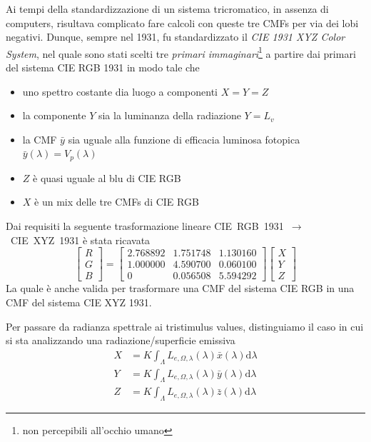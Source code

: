 Ai tempi della standardizzazione di un sistema tricromatico, in assenza di computers, risultava complicato fare calcoli con queste tre CMFs per via dei
lobi negativi. Dunque, sempre nel 1931, fu standardizzato il \textit{CIE 1931 XYZ Color System}, nel quale sono stati scelti tre 
\textit{primari immaginari}\footnote{non percepibili all'occhio umano} a partire dai primari del sistema CIE RGB 1931 in modo tale che
\begin{itemize}[topsep=0pt, noitemsep]
	\item uno spettro costante dia luogo a componenti $X = Y = Z$
	\item la componente $Y$ sia la luminanza della radiazione $Y = L_v$
	\item la CMF $\bar{y}$ sia uguale alla funzione di efficacia luminosa fotopica $\bar{y}(\lambda) = V_p(\lambda)$
	\item $Z$ \`e quasi uguale al blu di CIE RGB
	\item $X$ \`e un mix delle tre CMFs di CIE RGB
\end{itemize}
Dai requisiti la seguente trasformazione lineare \mbox{CIE RGB 1931 $\rightarrow$ CIE XYZ 1931} \`e stata ricavata
\begin{equation}\label{chapter2:colorimetry:RGB2XYZ}
	\begin{bmatrix}
		R \\ G \\ B
	\end{bmatrix}
	=
	\begin{bmatrix}
		2.768892 & 1.751748 & 1.130160 \\
		1.000000 & 4.590700 & 0.060100 \\
		0 & 0.056508 & 5.594292
	\end{bmatrix}
	\begin{bmatrix}
		X \\ Y \\ Z
	\end{bmatrix}
\end{equation}
La quale \`e anche valida per trasformare una CMF del sistema CIE RGB in una CMF del sistema CIE XYZ 1931.\par
Per passare da radianza spettrale ai tristimulus values, distinguiamo il caso in cui si sta analizzando una radiazione/superficie emissiva
\begin{align}
	X &= K\int_\Lambda L_{e,\Omega,\lambda}(\lambda)\bar{x}(\lambda)\mathrm{d}\lambda\\
	Y &= K\int_\Lambda L_{e,\Omega,\lambda}(\lambda)\bar{y}(\lambda)\mathrm{d}\lambda\\
	Z &= K\int_\Lambda L_{e,\Omega,\lambda}(\lambda)\bar{z}(\lambda)\mathrm{d}\lambda
\end{align}
